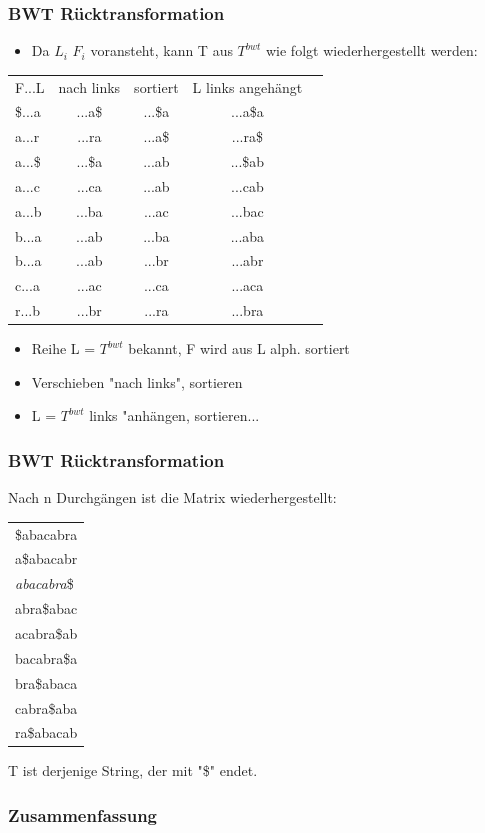 \documentclass{beamer}
\begin{document}
\begin{frame}
\frametitle{BWT R\"ucktransformation}
\begin{itemize}
\item Da $L_i$ $F_i$ voransteht, kann T aus $T^{bwt}$ wie folgt wiederhergestellt werden:
\end{itemize}
\begin{tabular}{l c cc r}
F...L & nach links &sortiert& L links angeh\"angt\\
\$...a &...a\$ &...\$a&...a\$a\\
a...r &...ra &...a\$&...ra\$\\
a...\$ &...\$a &...ab&...\$ab\\
a...c &...ca &...ab&...cab\\
a...b &...ba &...ac&...bac\\
b...a &...ab &...ba&...aba\\
b...a &...ab &...br&...abr\\
c...a &...ac &...ca&...aca\\
r...b &...br &...ra&...bra\\
\end{tabular}
\begin{itemize}
\item Reihe L = $T^{bwt}$ bekannt, F wird aus L alph. sortiert
\item Verschieben "nach links", sortieren
\item L = $T^{bwt}$ links "anh\"angen, sortieren...
\end{itemize}
\end{frame}
\begin{frame}
\frametitle{BWT R\"ucktransformation}
Nach n Durchg\"angen ist die Matrix wiederhergestellt:\newline
\begin{tabular}{l}
\$abacabra \\
a\$abacabr \\
\color{red}\textit{abacabra}\$ \\
abra\$abac \\
acabra\$ab \\
bacabra\$a \\
bra\$abaca \\
cabra\$aba \\
ra\$abacab \\
\end{tabular}
\newline T ist derjenige String, der mit "\$" endet.
\end{frame}
\begin{frame}
 \frametitle{Zusammenfassung}
\end{frame}
\end{document}
